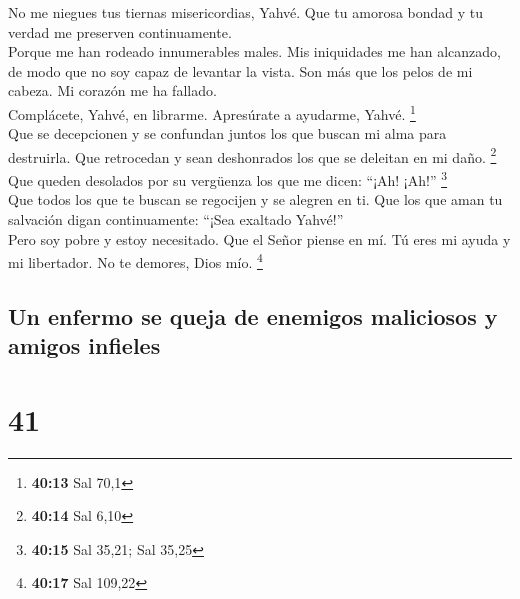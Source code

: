  No me niegues tus tiernas misericordias, Yahvé. Que tu
amorosa bondad y tu verdad me preserven continuamente.\\
 Porque me han rodeado innumerables males. Mis
iniquidades me han alcanzado, de modo que no soy capaz de levantar la
vista. Son más que los pelos de mi cabeza. Mi corazón me ha fallado.\\
 Complácete, Yahvé, en librarme. Apresúrate a ayudarme,
Yahvé. \footnote{\textbf{40:13} Sal 70,1}\\
 Que se decepcionen y se confundan juntos los que buscan
mi alma para destruirla. Que retrocedan y sean deshonrados los que se
deleitan en mi daño. \footnote{\textbf{40:14} Sal 6,10}\\
 Que queden desolados por su vergüenza los que me dicen:
``¡Ah! ¡Ah!'' \footnote{\textbf{40:15} Sal 35,21; Sal 35,25}\\
 Que todos los que te buscan se regocijen y se alegren en
ti. Que los que aman tu salvación digan continuamente: ``¡Sea exaltado
Yahvé!''\\
 Pero soy pobre y estoy necesitado. Que el Señor piense
en mí. Tú eres mi ayuda y mi libertador. No te demores, Dios mío.
\footnote{\textbf{40:17} Sal 109,22}

\hypertarget{un-enfermo-se-queja-de-enemigos-maliciosos-y-amigos-infieles}{%
\subsection{Un enfermo se queja de enemigos maliciosos y amigos
infieles}\label{un-enfermo-se-queja-de-enemigos-maliciosos-y-amigos-infieles}}

\hypertarget{section-39}{%
\section{41}\label{section-39}}

